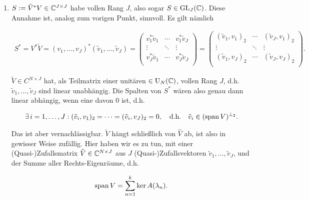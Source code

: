 \begin{enumerate}[label = \arabic*.]
    \item $S := \tilde V^\ast V \in \mathbb{C}^{J \times J}$ habe vollen Rang $J$, also sogar $S \in \operatorname{GL}_J(\mathbb{C})$.
    Diese Annahme ist, analog zum vorigen Punkt, sinnvoll.
    Es gilt nämlich

    \begin{align*}
        S^\ast
        =
        V^\ast \tilde V
        =
        (v_1, \dots, v_J)^\ast (\tilde v_1, \dots, \tilde v_J)
        =
        \begin{pmatrix}
            v_1^\ast \tilde v_1 & \cdots & v_1^\ast \tilde v_J \\
            \vdots              & \ddots & \vdots              \\
            v_J^\ast \tilde v_1 & \cdots & v_J^\ast \tilde v_J \\
        \end{pmatrix}
        =
        \begin{pmatrix}
            (\tilde v_1, v_1)_2 & \cdots & (\tilde v_J, v_1)_2 \\
            \vdots              & \ddots & \vdots              \\
            (\tilde v_1, v_J)_2 & \cdots & (\tilde v_J, v_J)_2 \\
        \end{pmatrix}.
    \end{align*}

    $\tilde V \in C^{N \times J}$ hat, als Teilmatrix einer unitären $\in \operatorname{U}_N(\mathbb{C})$, vollen Rang $J$, d.h. $\tilde v_1, \dots, \tilde v_J$ sind linear unabhängig.
    Die Spalten von $S^\ast$ wären also genau dann linear abhängig, wenn eine davon $0$ ist, d.h.

    \begin{align*}
        \exists \, i = 1, \dots, J:
            (\tilde v_i, v_1)_2 = \cdots = (\tilde v_i, v_J)_2 = 0,
            \quad
            \text{d.h.}
            \quad
            \tilde v_i \in (\operatorname{span} V)^{\bot_2}.
    \end{align*}

    Das ist aber vernachlässigbar.
    $\tilde V$ hängt schließlich von $\hat V$ ab, ist also in gewisser Weise zufällig.
    Hier haben wir es zu tun, mit einer (Quasi-)Zufallsmatrix $\tilde V \in \mathbb{C}^{N \times J}$ aus $J$ (Quasi-)Zufallsvektoren $\tilde v_1, \dots, \tilde v_J$, und der Summe aller Rechts-Eigenräume, d.h.

    \begin{align*}
        \operatorname{span} V
        =
        \sum_{n=1}^k
            \ker A(\lambda_n).
    \end{align*}

\end{enumerate}
